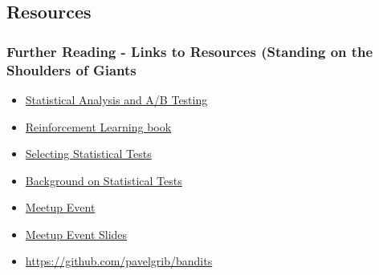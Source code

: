 \documentclass[]{beamer}
\theoremstyle{definition}
\begin{document}
\subsection{Resources}

\begin{frame}
\frametitle{Further Reading - Links to Resources (Standing on the Shoulders of Giants}
\begin{itemize}
\item \href{http://20bits.com/article/statistical-analysis-and-ab-testing}{Statistical Analysis and A/B Testing}
\item \href{http://www.amazon.com/Reinforcement-Learning-Introduction-Adaptive-Computation/dp/0262193981}{Reinforcement Learning book}
\item \href{http://www.socialresearchmethods.net/selstat/ssstart.htm}{Selecting Statistical Tests}
\item \href{http://www.graphpad.com/support/faqid/1790/}{Background on Statistical Tests}
\item \href{http://www.meetup.com/NYData/events/160722942/?_af_eid=160722942&a=uc1_te&_af=event}{Meetup Event}
\item \href{http://chrishalpert.com/NYDW\%20Bandit\%20Presentation.ppsx}{Meetup Event Slides}
\item \href{https://github.com/pavelgrib/bandits}{https://github.com/pavelgrib/bandits}
\end{itemize}
\end{frame}
\end{document}
